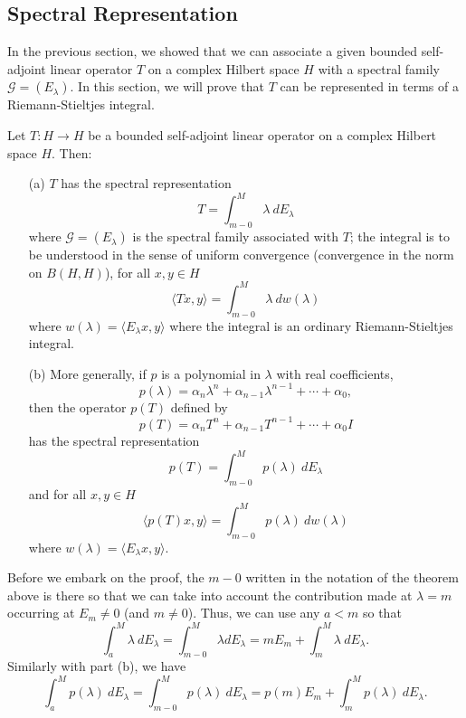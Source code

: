 \subsection{Spectral Representation}

In the previous section, we showed that we can associate a given bounded self-adjoint linear operator \( T  \) on a complex Hilbert space \( H  \) with a spectral family \( \mathcal{G} = ({E}_{\lambda}) \). In this section, we will prove that \( T  \) can be represented in terms of a Riemann-Stieltjes integral. 

\begin{theorem}
    Let \( T : H \to H  \) be a bounded self-adjoint linear operator on a complex Hilbert space \( H  \). Then:
    \begin{enumerate}
        \item[(a)] \( T  \) has the spectral representation 
            \[  T = \int_{ m - 0  }^{ M  }  \lambda  \ d {E}_{\lambda} \tag{1} \]
            where \( \mathcal{G} = ({E}_{\lambda}) \) is the spectral family associated with \( T  \); the integral is to be understood in the sense of uniform convergence (convergence in the norm on \(B(H,H) \)), for all \( x,y \in H \) \[  \langle Tx , y \rangle = \int_{ m - 0  }^{  M  } \lambda  \ d w(\lambda) \tag{1*} \]
            where \( w(\lambda) = \langle {E}_{\lambda} x  ,  y  \rangle  \) where the integral is an ordinary Riemann-Stieltjes integral. 
        \item[(b)] More generally, if \( p  \) is a polynomial in \( \lambda  \) with real coefficients,
            \[ p(\lambda) = {\alpha}_{n} \lambda^{n} + {\alpha}_{n-1} \lambda^{n-1} + \cdots  + {\alpha}_{0}, \]
            then the operator \( p(T) \) defined by  
            \[  p(T)  = {\alpha}_{n} T^{n} + {\alpha}_{n-1} T^{n-1} + \cdots + {\alpha}_{0} I \]
            has the spectral representation 
            \[  p(T) = \int_{ m - 0  }^{ M  }  p(\lambda) \ d {E}_{\lambda} \tag{2} \]
            and for all \( x,y \in H  \) 
            \[  \langle p(T) x  , y  \rangle = \int_{ m - 0  }^{  M  }  p(\lambda)  \ d w(\lambda) \tag{2*} \]
            where \( w(\lambda) = \langle {E}_{\lambda}x  , y \rangle \).
    \end{enumerate}
\end{theorem}


\begin{remark}
    Before we embark on the proof, the \( m - 0  \) written in the notation of the theorem above is there so that we can take into account the contribution made at \( \lambda = m  \) occurring at \( {E}_{m} \neq 0  \) (and \( m \neq 0  \)). Thus, we can use any \( a < m  \) so that 
    \[  \int_{ a }^{ M  } \lambda  \ d {E}_{\lambda} = \int_{ m - 0  }^{  M  }  \lambda d {E}_{\lambda} = m {E}_{m} + \int_{ m  }^{ M  }  \lambda  \ d {E}_{\lambda}. \]
    Similarly with part (b), we have
    \[  \int_{ a }^{ M }  p(\lambda) \ d {E}_{\lambda} = \int_{ m - 0  }^{ M  }  p(\lambda) \ d {E}_{\lambda} = p(m) {E}_{m} + \int_{ m }^{ M  } p(\lambda) \ d {E}_{\lambda}. \]
\end{remark}


